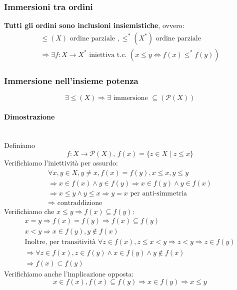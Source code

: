 \documentclass{report}
\newcommand{\subsubsubsection}[1]{\paragraph{#1}\mbox{}\\}
\begin{document}
        \subsubsection{Immersioni tra ordini}
            \textbf{Tutti gli ordini sono inclusioni insiemistiche}, ovvero:
            $$\begin{array}{c}
                \leq\left(X\right)\textrm{ ordine parziale }, \leq^{*}\left(X^{*}\right)\textrm{ ordine parziale } \\
                \Longrightarrow \exists f: X \rightarrow X^{*} \textrm{ iniettiva t.c. } \left(x \leq y 
                \Longleftrightarrow f\left(x\right) \leq^{*} f\left(y\right)\right)
            \end{array}$$
        \subsubsection{Immersione nell'insieme potenza}
            $$\exists \leq\left(X\right) \Longrightarrow \exists \textrm{ immersione } \subseteq\left(\mathcal{P}\left(X\right)\right)$$
            \subsubsubsection{Dimostrazione}
                Definiamo 
                $$f: X \rightarrow \mathcal{P}\left(X\right), \, f\left(x\right) = \{z \in X \mid z \leq x\}$$
                Verifichiamo l'iniettività per assurdo:
                $$\begin{array}{c}
                    \forall x, y \in X, y \neq x, f\left(x\right) = f\left(y\right), x \leq x, y \leq y \\
                    \Longrightarrow x \in f\left(x\right) \wedge y \in f\left(y\right) 
                    \Longrightarrow x \in f\left(y\right) \wedge y \in f\left(x\right) \\
                    \Longrightarrow x \leq y \wedge y \leq x \Longrightarrow y = x \textrm{ per anti-simmetria } \\
                    \Longrightarrow \textrm{ contraddizione }
                \end{array}$$
                Verifichiamo che $x \leq y \Longrightarrow f\left(x\right) \subseteq f\left(y\right)$:
                $$\begin{array}{c}
                    x = y \Longrightarrow f\left(x\right) = f\left(y\right) \Longrightarrow f\left(x\right) \subseteq f\left(y\right) \\
                    x < y \Longrightarrow x \in f\left(y\right), y \notin f\left(x\right)\\
                    \textrm{Inoltre, per transitività } \forall z \in f\left(x\right), z \leq x < y \Longrightarrow z < y \Longrightarrow z \in f\left(y\right) \\
                    \Longrightarrow \forall z \in f\left(x\right), z \in f\left(y\right) \wedge x \in f\left(y\right) \wedge y \notin f\left(x\right) \\
                    \Longrightarrow f\left(x\right) \subset f\left(y\right)
                \end{array}$$
                Verifichiamo anche l'implicazione opposta:
                $$x \in f\left(x\right), f\left(x\right) \subseteq f\left(y\right) \Longrightarrow x \in f\left(y\right) \Longrightarrow x \leq y$$
\end{document}
